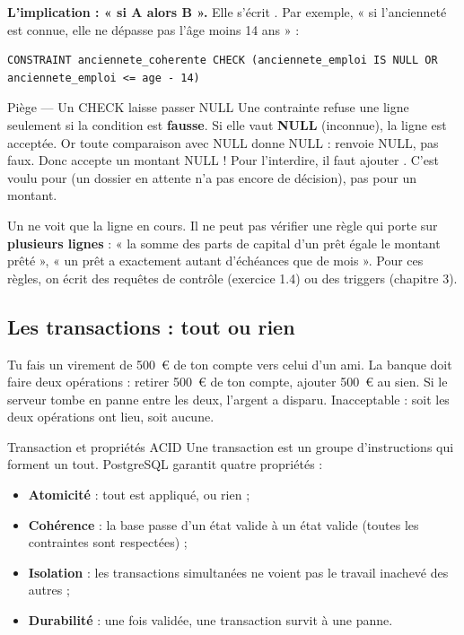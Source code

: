 \textbf{L'implication : « si A alors B ».} Elle s'écrit . Par exemple, « si l'ancienneté
est connue, elle ne dépasse pas l'âge moins 14 ans » :
\begin{lstlisting}[style=sql]
CONSTRAINT anciennete_coherente CHECK (anciennete_emploi IS NULL OR anciennete_emploi <= age - 14)
\end{lstlisting}

\begin{piege}{Piège --- Un CHECK laisse passer NULL}
Une contrainte  refuse une ligne seulement si la condition est \textbf{fausse}. Si elle
vaut \textbf{NULL} (inconnue), la ligne est acceptée. Or toute comparaison avec NULL donne NULL :
 renvoie NULL, pas faux. Donc  accepte un montant
NULL ! Pour l'interdire, il faut ajouter . C'est voulu pour  (un
dossier en attente n'a pas encore de décision), pas pour un montant.
\end{piege}

\begin{observation}
Un  ne voit que la ligne en cours. Il ne peut pas vérifier une règle qui porte sur
\textbf{plusieurs lignes} : « la somme des parts de capital d'un prêt égale le montant prêté », « un
prêt a exactement autant d'échéances que de mois ». Pour ces règles, on écrit des requêtes de contrôle
(exercice 1.4) ou des triggers (chapitre 3).
\end{observation}

\subsection{Les transactions : tout ou rien}

\begin{imagine}
Tu fais un virement de 500~€ de ton compte vers celui d'un ami. La banque doit faire deux opérations :
retirer 500~€ de ton compte, ajouter 500~€ au sien. Si le serveur tombe en panne entre les deux,
l'argent a disparu. Inacceptable : soit les deux opérations ont lieu, soit aucune.
\end{imagine}

\begin{definition}{Transaction et propriétés ACID}
Une transaction est un groupe d'instructions qui forment un tout. PostgreSQL garantit quatre
propriétés :
\begin{itemize}
\item \textbf{Atomicité} : tout est appliqué, ou rien ;
\item \textbf{Cohérence} : la base passe d'un état valide à un état valide (toutes les contraintes sont
respectées) ;
\item \textbf{Isolation} : les transactions simultanées ne voient pas le travail inachevé des autres ;
\item \textbf{Durabilité} : une fois validée, une transaction survit à une panne.
\end{itemize}
\end{definition}

